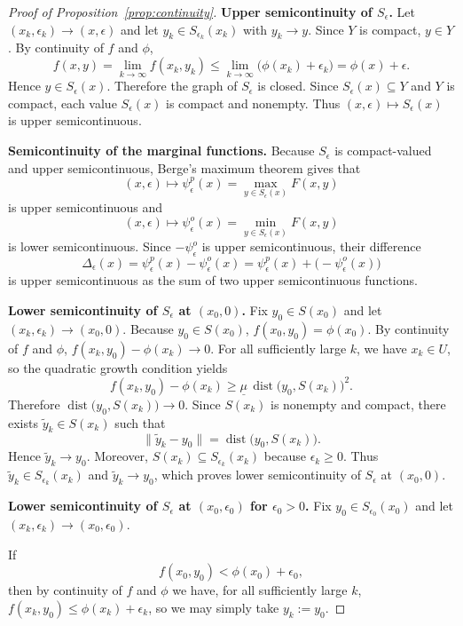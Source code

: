 \documentclass[11pt]{article}
\theoremstyle{definition}
\newcommand{\eps}{\epsilon}
\DeclareMathOperator{\dist}{dist}
\begin{document}
\begin{proof}[Proof of Proposition~\ref{prop:continuity}]
\textbf{Upper semicontinuity of $S_\eps$.}
Let $(x_k,\eps_k)\to(x,\eps)$ and let $y_k\in S_{\eps_k}(x_k)$
with $y_k\to y$. Since $Y$ is compact, $y\in Y$. By continuity of
$f$ and $\phi$,
\[
f(x,y)=\lim_{k\to\infty}f(x_k,y_k)
\le \lim_{k\to\infty}\bigl(\phi(x_k)+\eps_k\bigr)
= \phi(x)+\eps.
\]
Hence $y\in S_\eps(x)$. Therefore the graph of $S_\eps$ is
closed. Since $S_\eps(x)\subseteq Y$ and $Y$ is compact, each
value $S_\eps(x)$ is compact and nonempty. Thus
$(x,\eps)\mapsto S_\eps(x)$ is upper semicontinuous.

\medskip
\textbf{Semicontinuity of the marginal functions.}
Because $S_\eps$ is compact-valued and upper semicontinuous, Berge's
maximum theorem gives that
\[
(x,\eps)\mapsto \psi_\eps^p(x)=\max_{y\in S_\eps(x)}F(x,y)
\]
is upper semicontinuous and
\[
(x,\eps)\mapsto \psi_\eps^o(x)=\min_{y\in S_\eps(x)}F(x,y)
\]
is lower semicontinuous. Since $-\psi_\eps^o$ is upper
semicontinuous, their difference
\[
\Delta_\eps(x)=\psi_\eps^p(x)-\psi_\eps^o(x)
=\psi_\eps^p(x)+\bigl(-\psi_\eps^o(x)\bigr)
\]
is upper semicontinuous as the sum of two upper semicontinuous
functions.

\medskip
\textbf{Lower semicontinuity of $S_\eps$ at $(x_0,0)$.}
Fix $y_0\in S(x_0)$ and let $(x_k,\eps_k)\to(x_0,0)$.
Because $y_0\in S(x_0)$, $f(x_0,y_0)=\phi(x_0)$.
By continuity of $f$ and $\phi$, $f(x_k,y_0)-\phi(x_k)\to 0$.
For all sufficiently large $k$, we have $x_k\in U$, so the quadratic
growth condition yields
\[
f(x_k,y_0)-\phi(x_k)
\ge \underline\mu\,\dist\bigl(y_0,S(x_k)\bigr)^2.
\]
Therefore $\dist\bigl(y_0,S(x_k)\bigr)\to 0$.
Since $S(x_k)$ is nonempty and compact, there exists
$\tilde y_k\in S(x_k)$ such that
\[
\|\tilde y_k-y_0\|=\dist\bigl(y_0,S(x_k)\bigr).
\]
Hence $\tilde y_k\to y_0$. Moreover, $S(x_k)\subseteq S_{\eps_k}(x_k)$
because $\eps_k\ge 0$. Thus $\tilde y_k\in S_{\eps_k}(x_k)$ and
$\tilde y_k\to y_0$, which proves lower semicontinuity of
$S_\eps$ at $(x_0,0)$.

\medskip
\textbf{Lower semicontinuity of $S_\eps$ at $(x_0,\eps_0)$ for
$\eps_0>0$.}
Fix $y_0\in S_{\eps_0}(x_0)$ and let $(x_k,\eps_k)\to(x_0,\eps_0)$.

If
\[
f(x_0,y_0)<\phi(x_0)+\eps_0,
\]
then by continuity of $f$ and $\phi$ we have, for all sufficiently
large $k$, $f(x_k,y_0)\le \phi(x_k)+\eps_k$, so we may simply take $y_k:=y_0$.


\end{proof}
\end{document}
